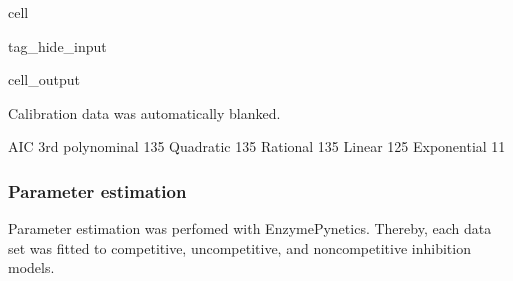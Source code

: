 \documentclass[letterpaper,10pt,english]{jupyterBook}
\begin{document}
\begin{sphinxuseclass}{cell}
\begin{sphinxuseclass}{tag_hide_input}
\begin{sphinxVerbatimOutput}
\begin{sphinxuseclass}{cell_output}
\begin{sphinxVerbatim}[commandchars=\\\{\}]
Calibration data was automatically blanked.
\end{sphinxVerbatim}

\begin{sphinxVerbatim}[commandchars=\\\{\}]
                 AIC
3rd polynominal \PYGZhy{}135
Quadratic       \PYGZhy{}135
Rational        \PYGZhy{}135
Linear          \PYGZhy{}125
Exponential      \PYGZhy{}11
\end{sphinxVerbatim}

\noindent{}

\end{sphinxuseclass}\end{sphinxVerbatimOutput}

\end{sphinxuseclass}
\end{sphinxuseclass}

\subsubsection{Parameter estimation}
\label{\detokenize{scenarios/glycosidase_inhibition:parameter-estimation}}
\sphinxAtStartPar
Parameter estimation was perfomed with EnzymePynetics. Thereby, each data set was fitted to competitive, uncompetitive, and non\sphinxhyphen{}competitive inhibition models.
\end{document}
